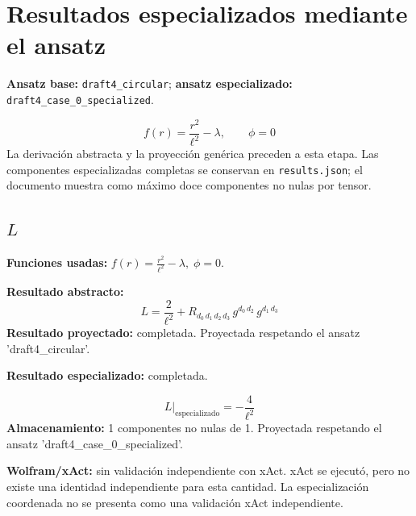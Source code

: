 \documentclass[11pt]{article}
\begin{document}
\section*{Resultados especializados mediante el ansatz}
\textbf{Ansatz base:} \texttt{draft4\_circular}; \textbf{ansatz especializado:} \texttt{draft4\_case\_0\_specialized}.\par
\begin{dmath*}[breakdepth={4}]
f\!\left(r\right) = \frac{{r}^{2}}{{\ell}^{2}} - \lambda,\qquad \phi = 0
\end{dmath*}
La derivación abstracta y la proyección genérica preceden a esta etapa. Las componentes especializadas completas se conservan en \texttt{results.json}; el documento muestra como máximo doce componentes no nulas por tensor.
\subsection*{$ L $}
\textbf{Funciones usadas:} $ f\!\left(r\right) = \frac{{r}^{2}}{{\ell}^{2}} - \lambda,\;\phi=0 $.\par
\textbf{Resultado abstracto:}
\begin{dmath*}[breakdepth={5}]
L = \frac{2}{{\ell}^{2}} + R{}_{d_{0}\,d_{1}\,d_{2}\,d_{3}}\,g{}^{d_{0}\,d_{2}}\,g{}^{d_{1}\,d_{3}}
\end{dmath*}
\textbf{Resultado proyectado:} completada. Proyectada respetando el ansatz 'draft4\_circular'.\par
\textbf{Resultado especializado:} completada.\par
\begin{dmath*}[breakdepth={5}]
L\big|_{\mathrm{especializado}} = -\frac{4}{{\ell}^{2}}
\end{dmath*}
\textbf{Almacenamiento:} 1 componentes no nulas de 1. Proyectada respetando el ansatz 'draft4\_case\_0\_specialized'.\par
\textbf{Wolfram/xAct:} sin validación independiente con xAct. xAct se ejecutó, pero no existe una identidad independiente para esta cantidad. La especialización coordenada no se presenta como una validación xAct independiente.\par\medskip
{}
\end{document}
